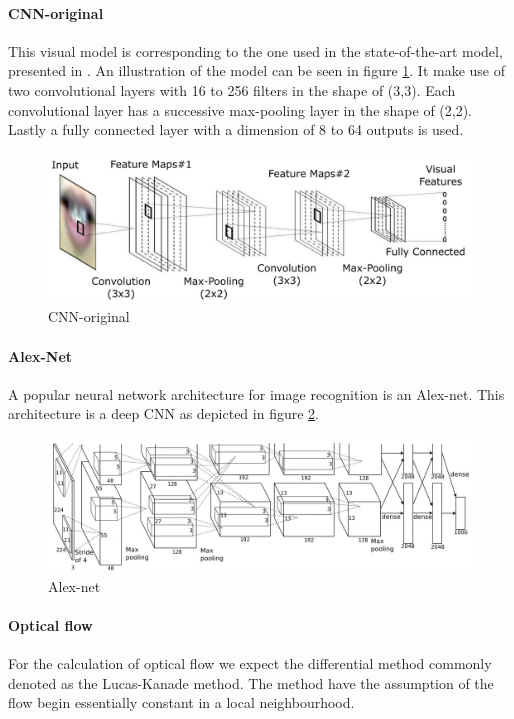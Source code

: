 \paragraph{CNN-original}
This visual model is corresponding to the one used in the state-of-the-art model, presented in \cite{Lee}.
An illustration of the model can be seen in figure \ref{fig:cnnOriginal}.
It make use of two convolutional layers with 16 to 256 filters in the shape of (3,3).
Each convolutional layer has a successive max-pooling layer in the shape of (2,2).
Lastly a fully connected layer with a dimension of 8 to 64 outputs is used.
\begin{figure}[h]
    \centering
    \includegraphics[width=\columnwidth]{fig/cnnOriginal.jpg}
    \caption{CNN-original}
    \label{fig:cnnOriginal}
\end{figure}

\paragraph{Alex-Net}
A popular neural network architecture for image recognition is an Alex-net\cite{Krizhevsky2012}.
This architecture is a deep CNN as depicted in figure \ref{fig:alexNet}.
\begin{figure}[h]
    \centering
    \includegraphics[width=\columnwidth]{fig/alexNet.jpg}
    \caption{Alex-net}
    \label{fig:alexNet}
\end{figure}

\paragraph{Optical flow}
For the calculation of optical flow we expect the differential method commonly denoted as the Lucas-Kanade method\cite{Lucas1981}.
The method have the assumption of the flow begin essentially constant in a local neighbourhood.

